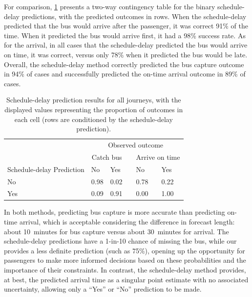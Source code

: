 For comparison, \cref{tab:eta_journey_results_avg2} presents a two-way contingency table for the binary schedule-delay predictions, with the predicted outcomes in rows. When the schedule-delay predicted that the bus would arrive after the passenger, it was correct 91\% of the time. When it predicted the bus would arrive first, it had a 98\% success rate. As for the arrival, in all cases that the schedule-delay predicted the bus would arrive on time, it was correct, versus only 78\% when it predicted the bus would be late. Overall, the schedule-delay method correctly predicted the bus capture outcome in 94\% of cases and successfully predicted the on-time arrival outcome in 89\% of cases.

\begin{knitrout}\small
{}\color{fgcolor}\begin{table}

\caption[Schedule-delay prediction results for all journeys]{\label{tab:eta_journey_results_avg2}Schedule-delay prediction results for all journeys, with the displayed values representing the proportion of outcomes in each cell (rows are conditioned by the schedule-delay prediction).}
\centering
\fontsize{8}{10}\selectfont
\begin{tabular}[t]{llllll}
\toprule
\multicolumn{1}{c}{} & \multicolumn{5}{c}{Observed outcome} \\
\cmidrule(l{3pt}r{3pt}){2-6}
\multicolumn{1}{c}{ } & \multicolumn{2}{c}{Catch bus} & \multicolumn{1}{c}{} & \multicolumn{2}{c}{Arrive on time} \\
\cmidrule(l{3pt}r{3pt}){2-3} \cmidrule(l{3pt}r{3pt}){5-6}
Schedule-delay Prediction & No & Yes &  & No & Yes\\
\midrule
No & 0.98 & 0.02 &  & 0.78 & 0.22\\
Yes & 0.09 & 0.91 &  & 0.00 & 1.00\\
\bottomrule
\end{tabular}
\end{table}


\end{knitrout}

In both methods, predicting bus capture is more accurate than predicting on-time arrival, which is acceptable considering the difference in forecast length: about 10~minutes for bus capture versus about 30~minutes for arrival. The schedule-delay predictions have a 1-in-10 chance of missing the bus, while our \pf{} provides a less definite prediction (such as 75\%), opening up the opportunity for passengers to make more informed decisions based on these probabilities and the importance of their constraints. In contrast, the schedule-delay method provides, at best, the predicted arrival time as a singular point estimate with no associated uncertainty, allowing only a ``Yes'' or ``No'' prediction to be made.


